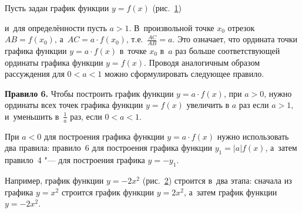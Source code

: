 
Пусть задан график функции $y  = f(x)$ (рис.\ \ref{fig_1_10_29})

\begin{figure}\label{fig_1_10_29}
\end{figure}

и~для определённости пусть $a > 1$.
В~произвольной точке $x_{0}$ отрезок $AB = f(x_{0})$,
а~$AC = a \cdot f(x_{0})$, т.е.~$\displaystyle \frac{AC}{AB} = a$.
Это означает, что ордината точки графика функции $y = a \cdot f(x)$
в~точке $x_{0}$ в~$a$ раз больше соответствующей ординаты графика
функции $y = f(x)$.
Проводя аналогичным образом рассуждения для $0 < a < 1$ можно
сформулировать следующее правило.

\textbf{Правило 6.} Чтобы построить график функции $y = a \cdot f(x)$,
при $a > 0$, нужно ординаты всех точек графика функции $y = f(x)$
увеличить в $a$ раз если $a > 1$, и~уменьшить в~$\displaystyle \frac{1}{a}$ раз,
если $0 < a < 1$.

\begin{figure}
\end{figure}

При $a < 0$ для построения графика функции $y = a \cdot f(x)$ нужно
использовать два правила: правило~6 для построения графика функции $y_{1} = |a| f(x)$,
а~затем правило~4 "--- для построения графика $y = -y_{1}$.

Например, график функции $y = -2x^{2}$ (рис.\ \ref{fig_1_10_30}) строится в~два этапа:
сначала из графика $y = x^{2}$ строится график функции $y = 2x^{2}$,
а~затем график функции $y = -2x^{2}$.

\begin{figure}\label{fig_1_10_30}
\end{figure}

